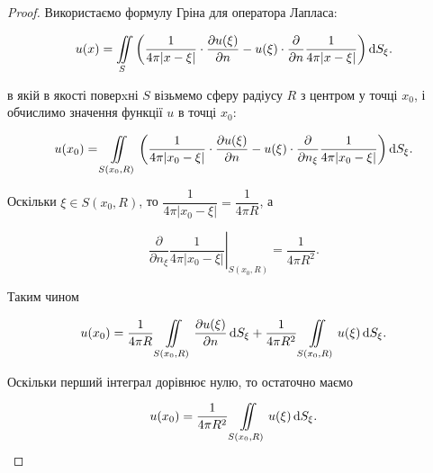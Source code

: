 \begin{proof}
	Використаємо формулу Гріна для оператора Лапласа:

	\begin{equation}
		u(x) = \displaystyle\iint\limits_S \left( \frac{1}{4 \pi |x - \xi|} \cdot \frac{\partial u(\xi)}{\partial n} - u(\xi) \cdot \frac{\partial}{\partial n} \frac{1}{4 \pi |x - \xi|} \right) \mathop{}\!\mathrm{d} S_\xi.
	\end{equation}

	в якій в якості поверxні $S$ візьмемо сферу радіусу $R$ з центром у точці $x_0$, і обчислимо значення функції $u$ в точці $x_0$:

	\begin{equation}
		u(x_0) = \displaystyle\iint\limits_{S(x_0, R)} \left( \frac{1}{4 \pi |x_0 - \xi|} \cdot \frac{\partial u(\xi)}{\partial n} - u(\xi) \cdot \frac{\partial}{\partial n_\xi} \frac{1}{4 \pi |x_0 - \xi|} \right) \mathop{}\!\mathrm{d} S_\xi.
	\end{equation}
	 
	Оскільки $\xi \in S(x_0, R)$, то $\dfrac{1}{4 \pi |x_0 - \xi|} = \dfrac{1}{4 \pi R}$, а

	\begin{equation}
		\left. \frac{\partial}{\partial n_\xi} \frac{1}{4 \pi |x_0 - \xi|} \right|_{S(x_0, R)} = \frac{1}{4 \pi R^2}.
	\end{equation}

	Таким чином 

	\begin{equation}
		u(x_0) = \frac{1}{4 \pi R} \displaystyle\iint\limits_{S(x_0, R)} \frac{\partial u(\xi)}{\partial n} \mathop{}\!\mathrm{d} S_\xi + \frac{1}{4 \pi R^2} \displaystyle\iint\limits_{S(x_0, R)} u(\xi) \mathop{}\!\mathrm{d} S_\xi.
	\end{equation}

	Оскільки перший інтеграл дорівнює нулю, то остаточно маємо

	\begin{equation}
		u(x_0) = \frac{1}{4 \pi R^2} \displaystyle\iint\limits_{S(x_0, R)} u(\xi) \mathop{}\!\mathrm{d} S_\xi .
	\end{equation}
\end{proof}